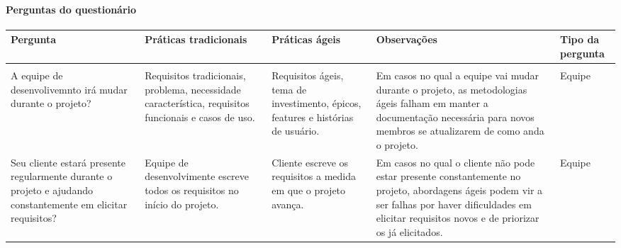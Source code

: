 \paragraph{Perguntas do questionário}
\label{sec:perguntas_do_questinario}
\clearpage


					\begin{longtable}{|p{3.5cm}|p{3.5cm}|p{3.5cm}|p{3.5cm}|p{2cm}|}
						\hline
						\textbf{Pergunta} &
						\textbf{Práticas tradicionais} &
						\textbf{Práticas ágeis} &
						\textbf{Observações} &
						\textbf{Tipo da pergunta}
						\\ \hline
						\endhead

						\hline \multicolumn{5}{|r|}{\longtableendfoot} \\ \hline
						\endfoot

						\endlastfoot

						A equipe de desenvolivemnto irá mudar durante o projeto? &
						Requisitos tradicionais, problema, necessidade característica, requisitos funcionais e casos de uso. &
						Requisitos ágeis, tema de investimento, épicos, features e histórias de usuário. &
						Em casos no qual a equipe vai mudar durante o projeto, as metodologias ágeis falham em manter a documentação necessária para novos membros se atualizarem de como anda o projeto. &
						Equipe
						\\ \hline

						Seu cliente estará presente regularmente durante o projeto e ajudando constantemente em elicitar requisitos? &
						Equipe de desenvolvimente escreve todos os requisitos no início do projeto. &
						Cliente escreve os requisitos a medida em que o projeto avança. &
						Em casos no qual o cliente não pode estar presente constantemente no projeto, abordagens ágeis podem vir a ser falhas por haver dificuldades em elicitar requisitos novos e de priorizar os já elicitados. &
						Equipe
						\\ \hline


\end{longtable}
